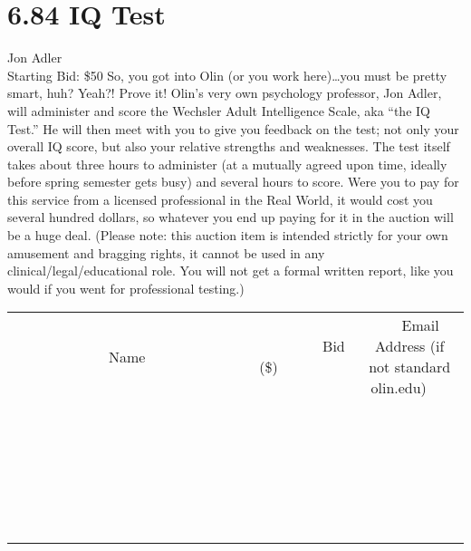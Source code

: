 \documentclass[11pt]{article}
\begin{document}
\section*{6.84 IQ Test}
Jon Adler
\\
Starting Bid: \$50
\newline
So, you got into Olin (or you work here)…you must be pretty smart, huh?  Yeah?!  Prove it!  Olin’s very own psychology professor, Jon Adler, will administer and score the Wechsler Adult Intelligence Scale, aka “the IQ Test.”  He will then meet with you to give you feedback on the test; not only your overall IQ score, but also your relative strengths and weaknesses.  The test itself takes about three hours to administer (at a mutually agreed upon time, ideally before spring semester gets busy) and several hours to score.  Were you to pay for this service from a licensed professional in the Real World, it would cost you several hundred dollars, so whatever you end up paying for it in the auction will be a huge deal.  (Please note: this auction item is intended strictly for your own amusement and bragging rights, it cannot be used in any clinical/legal/educational role.  You will not get a formal written report, like you would if you went for professional testing.)
\\[6ex]
\begin{tabular}{c c c}
~~~~~~~~~~~~~Name~~~~~~~~~~~~~ & ~~~~~~~~~Bid (\$)~~~~~~~~~  & ~~~Email Address (if not standard olin.edu)~~~\\
 & & \\
\hline
 & & \\
\hline
 & & \\
\hline
 & & \\
\hline
 & & \\
\hline
 & & \\
\hline
 & & \\
\hline
 & & \\
\hline
 & & \\
\hline
 & & \\
\hline
 & & \\
\hline
 & & \\
\hline
 & & \\
\hline
 & & \\
\hline
 & & \\
\hline
 & & \\
\hline
 & & \\
\hline
 & & \\
\hline
 & & \\
\hline
 & & \\
\hline
 & & \\
\hline
 & & \\
\hline
 & & \\
\hline
 & & \\
\hline
 & & \\
\hline
 & & \\
\hline
\end{tabular}
\newpage
\end{document}
